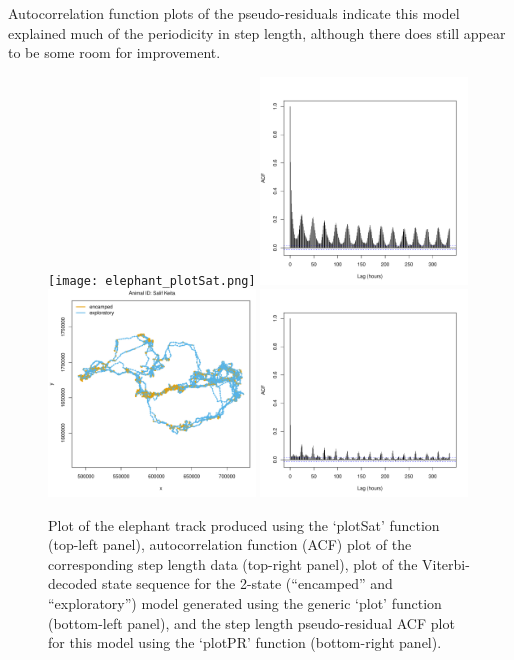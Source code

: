 \documentclass[12pt]{article}\usepackage[]{graphicx}\usepackage[]{xcolor}
\begin{document}
Autocorrelation function plots of the pseudo-residuals indicate this model explained much of the periodicity in step length, although there does still appear to be some room for improvement.

\begin{figure}[htbp]
  \texttt{[image: elephant\_plotSat.png]}
  \includegraphics[width=0.49\textwidth]{plot_elephantResults017.pdf}
  \includegraphics[width=0.49\textwidth]{plot_elephantResults015.pdf}
  \includegraphics[width=0.49\textwidth]{plot_elephantResults016.pdf}
  \caption{Plot of the elephant track produced using the `plotSat' function (top-left panel), autocorrelation function (ACF) plot of the corresponding step length data (top-right panel), plot of the Viterbi-decoded state sequence for the 2-state (``encamped'' and ``exploratory'') model generated using the generic `plot' function (bottom-left panel), and the step length pseudo-residual ACF plot for this model using the `plotPR' function (bottom-right panel).}
  \label{fig:elephantResults1}
\end{figure}
\end{document}
